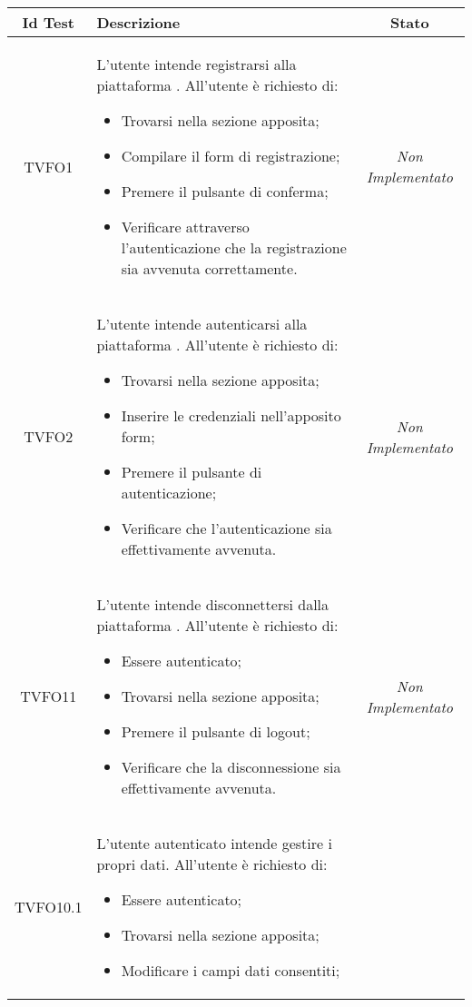 	\normalsize
	\begin{longtable}[ht]{|c|>{}m{8cm}|c|}
		\hline 
		\textbf{Id Test} & \textbf{Descrizione} & \textbf{Stato}\\
		\hline
		\endhead
		\hypertarget{TVFO1}{TVFO1} & L’utente intende registrarsi alla piattaforma \progetto. All’utente è richiesto di:
		\begin{itemize}
			\item Trovarsi nella sezione apposita;
			\item Compilare il form di registrazione;
			\item Premere il pulsante di conferma;
			\item Verificare attraverso l’autenticazione che la registrazione sia avvenuta correttamente.
		\end{itemize}
		& \textit{Non Implementato}\\ \hline
		\hypertarget{TVFO2}{TVFO2} & L’utente intende autenticarsi alla piattaforma \progetto. All’utente è richiesto di:
		\begin{itemize}
			\item Trovarsi nella sezione apposita;
			\item Inserire le credenziali nell’apposito form;
			\item Premere il pulsante di autenticazione;
			\item Verificare che l’autenticazione sia effettivamente avvenuta.
		\end{itemize}
		& \textit{Non Implementato}\\ \hline
		\hypertarget{TVFO11}{TVFO11} & L’utente intende disconnettersi dalla piattaforma \progetto. All’utente è richiesto di:
		\begin{itemize}
			\item Essere autenticato;
			\item Trovarsi nella sezione apposita;
			\item Premere il pulsante di logout;
			\item Verificare che la disconnessione sia effettivamente avvenuta.
		\end{itemize}
		& \textit{Non Implementato}\\ \hline
		\hypertarget{TVFO10.1}{TVFO10.1} & L’utente autenticato intende gestire i propri dati. All’utente è richiesto di:
		\begin{itemize}
			\item Essere autenticato;
			\item Trovarsi nella sezione apposita;
			\item Modificare i campi dati consentiti;

\end{itemize}
\end{longtable}
